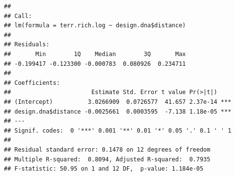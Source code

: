 \documentclass[]{article}
\newenvironment{Shaded}{\begin{snugshade}}{\end{snugshade}}
\newcommand{\CommentTok}[1]{\textcolor[rgb]{0.56,0.35,0.01}{\textit{#1}}}
\newcommand{\DecValTok}[1]{\textcolor[rgb]{0.00,0.00,0.81}{#1}}
\newcommand{\KeywordTok}[1]{\textcolor[rgb]{0.13,0.29,0.53}{\textbf{#1}}}
\newcommand{\NormalTok}[1]{#1}
\newcommand{\OperatorTok}[1]{\textcolor[rgb]{0.81,0.36,0.00}{\textbf{#1}}}
\newcommand{\StringTok}[1]{\textcolor[rgb]{0.31,0.60,0.02}{#1}}
\begin{document}
\begin{Shaded}
\end{Shaded}

\begin{verbatim}
## 
## Call:
## lm(formula = terr.rich.log ~ design.dna$distance)
## 
## Residuals:
##       Min        1Q    Median        3Q       Max 
## -0.199417 -0.123300 -0.000783  0.080926  0.234711 
## 
## Coefficients:
##                       Estimate Std. Error t value Pr(>|t|)    
## (Intercept)          3.0266909  0.0726577  41.657 2.37e-14 ***
## design.dna$distance -0.0025661  0.0003595  -7.138 1.18e-05 ***
## ---
## Signif. codes:  0 '***' 0.001 '**' 0.01 '*' 0.05 '.' 0.1 ' ' 1
## 
## Residual standard error: 0.1478 on 12 degrees of freedom
## Multiple R-squared:  0.8094, Adjusted R-squared:  0.7935 
## F-statistic: 50.95 on 1 and 12 DF,  p-value: 1.184e-05
\end{verbatim}

\begin{Shaded}
\end{Shaded}
\end{document}
